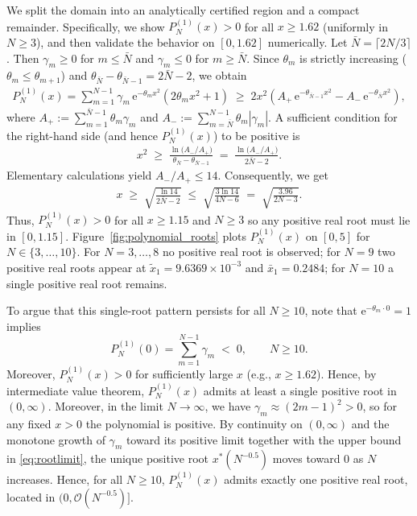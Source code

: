 \documentclass[journal,12pt,onecolumn,draftclsnofoot]{IEEEtran}
\theoremstyle{definition}
\begin{document}
We split the domain into an analytically certified region and a compact remainder. Specifically, we show \(P_{N}^{(1)}(x)>0\) for all \(x\ge 1.62\) (uniformly in \(N\ge 3\)), and then validate the behavior on \([0,1.62]\) numerically.  Let \(\bar N=\big\lceil2N/3\big\rceil\). Then \(\gamma_m\ge 0\) for \(m\le \bar N\) and \(\gamma_m\le 0\) for \(m\ge \bar N\). Since \(\theta_m\) is strictly increasing (\(\theta_m\le \theta_{m+1}\)) and \(\theta_{\bar N}-\theta_{\bar N-1}= 2\bar N-2\), we obtain
\begin{align}
P_N^{(1)}(x)
=\sum_{m=1}^{N-1}\gamma_m \, \mathrm{e}^{-\theta_m x^2}\!\left(2\theta_m x^2+1\right)
\;\ge\;
2x^2\!\left(A_{+}\,\mathrm{e}^{-\theta_{\bar N-1}x^2}-A_{-}\,\mathrm{e}^{-\theta_{\bar N}x^2}\right),
\end{align}
where $A_{+}:=\sum_{m=1}^{\bar N-1}\theta_m\gamma_m$
and $A_{-}:=\sum_{m=\bar N}^{N-1}\theta_m|\gamma_m|$. A sufficient condition for the right-hand side (and hence $P_N^{(1)}(x)$) to be positive is
\begin{align}
x^2 \;\ge\; \frac{\ln\!\big(A_{-}/A_{+}\big)}{\theta_{\bar N}-\theta_{\bar N-1}}
\;=\; \frac{\ln\!\big(A_{-}/A_{+}\big)}{2\bar N-2}.
\end{align}
Elementary calculations yield \(A_{-}/A_{+}\le 14\). Consequently, we get 
\begin{align}\label{eq:rootlimit}
x
\;\ge\; \sqrt{\frac{\ln 14}{2\bar N-2}}
\;\le\; \sqrt{\frac{3\ln 14}{4N-6}}
\;=\; \sqrt{\frac{3.96}{2N-3}}.
\end{align}
Thus, \(P_N^{(1)}(x)>0\) for all \(x\ge 1.15\) and \(N\ge 3\) so any positive real root must lie in \([0,1.15]\).  Figure~\ref{fig:polynomial_roots} plots \(P_{N}^{(1)}(x)\) on \([0,5]\) for \(N\in\{3,\ldots,10\}\). For \(N=3,\ldots,8\) no positive real root is observed; for \(N=9\) two positive real roots appear at $\tilde{x}_1 = 9.6369\times 10^{-3}$ and $\bar{x}_1 = 0.2484$; for \(N=10\) a single positive real root remains.


 To argue that this single-root pattern persists for all \(N\ge 10\), note that \(\mathrm{e}^{-\theta_m\cdot 0}=1\) implies
\begin{equation}\label{eq:f0}
P_{N}^{(1)}(0)=\sum_{m=1}^{N-1}\gamma_m \;<\; 0,\qquad N\ge 10.
\end{equation}
Moreover, \(P_{N}^{(1)}(x)>0\) for sufficiently large \(x\) (e.g., \(x\ge 1.62\)). Hence, by intermediate value theorem, $P_{N}^{(1)}(x)$ admits at least a single positive root in $(0,\infty)$. Moreover, in the limit \(N\to\infty\), we have \(\gamma_m \approx (2m-1)^2>0\), so for any fixed \(x>0\) the polynomial is positive. By continuity on \((0,\infty)\) and the monotone growth of \(\gamma_m\) toward its positive limit together with the upper bound in \eqref{eq:rootlimit}, the unique positive root \(x^\ast(N^{-0.5})\) moves toward \(0\) as \(N\) increases. Hence, for all \(N\ge 10\), \(P_{N}^{(1)}(x)\) admits exactly one positive real root, located in \((0,\mathcal{O}(N^{-0.5})]\).
\end{document}
